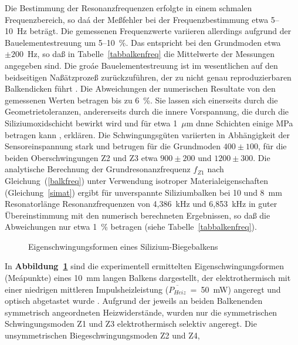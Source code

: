 Die Bestimmung der Resonanzfrequenzen erfolgte in einem
schmalen Frequenzbereich, so daá der Meßfehler bei der Frequenzbestimmung
etwa 5--10~Hz beträgt. Die gemessenen Frequenzwerte variieren
allerdings aufgrund der Bauelementestreuung um 5--10~\%. Das entspricht
bei den Grundmoden etwa $\pm200$~Hz, so daß
in Tabelle~\ref{tabbalkenfreq} die Mittelwerte der Messungen angegeben sind.
Die groáe Bauelementestreuung ist im wesentlichen auf den beidseitigen
Naßätzprozeß zurückzuführen, der zu nicht genau reproduzierbaren
Balkendicken führt \cite{ABV93}. Die Abweichungen der numerischen
Resultate von den gemessenen Werten betragen bis zu 6~\%. Sie lassen sich
einerseits durch die Geometrietoleranzen, andererseits durch die innere
Vorspannung, die durch die Siliziumoxidschicht bewirkt wird und für
etwa 1~$\mu$m dnne Schichten einige MPa betragen kann \cite{Mur92},
erklären. Die Schwingungsgüten variierten in Abhängigkeit der
Sensoreinspannung stark und betrugen für die Grundmoden $400\pm100$, für die
beiden Oberschwingungen Z2 und Z3 etwa $900\pm200$ und $1200\pm300$.
Die analytische Berechnung der Grundresonanzfrequenz $f_{Z1}$
nach Gleichung~(\ref{balkfreq}) unter Verwendung isotroper
Materialeigenschaften (Gleichung~\ref{simat}) ergibt für
unverspannte Siliziumbalken bei 10 und 8~mm Resonatorlänge
Resonanzfrequenzen von 4,386~kHz und 6,853~kHz in guter Übereinstimmung
mit den numerisch berechneten Ergebnissen, so daß die Abweichungen nur etwa
1~\% betragen (siehe Tabelle~\ref{tabbalkenfreq}).
\begin{figure}[htb]
\begin{center}

\setabbvda
\end{center}
\caption{\label{abbbalkenmoden}
 Eigenschwingungsformen eines Silizium-Biegebalkens}
\end{figure}
In {\bf Abbildung~\ref{abbbalkenmoden}} sind die experimentell ermittelten
Eigenschwingungsformen (Meápunkte) eines 10~mm langen Balkens dargestellt,
der elektrothermisch mit einer niedrigen mittleren Impulsheizleistung
($\overline{P_{Heiz}}$~=~50~mW) angeregt und optisch abgetastet
wurde \cite{Mue92}. Aufgrund der jeweils an beiden Balkenenden symmetrisch
angeordneten Heizwiderstände, wurden nur die symmetrischen Schwingungsmoden
Z1 und Z3 elektrothermisch selektiv angeregt. Die unsymmetrischen
Biegeschwingungsmoden Z2 und Z4,
